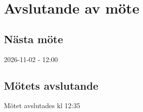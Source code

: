 \documentclass[protokoll]{dvd}
\begin{document}

\newpage
\section{Avslutande av möte}

\subsection{Nästa möte}
2026-11-02 - 12:00

\subsection{Mötets avslutande}
Mötet avslutades kl 12:35 

\styrelsesignaturer
\end{document}
